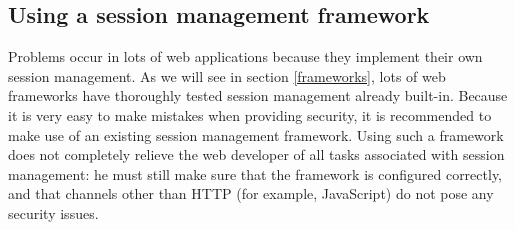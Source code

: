 \subsection{Using a session management framework}\label{use-framework}

Problems occur in lots of web applications because they implement their own session management. As we will see in section \ref{frameworks}, lots of web frameworks have thoroughly tested session management already built-in. Because it is very easy to make mistakes when providing security, it is recommended to make use of an existing session management framework. Using such a framework does not completely relieve the web developer of all tasks associated with session management: he must still make sure that the framework is configured correctly, and that channels other than HTTP (for example, JavaScript) do not pose any security issues.
